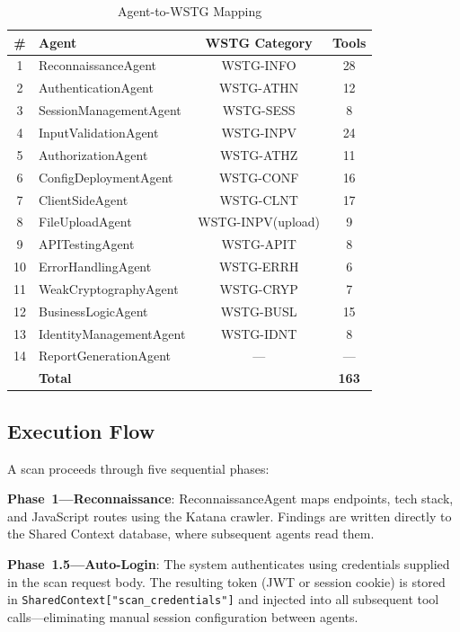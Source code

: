 \documentclass[conference]{IEEEtran}
\begin{document}
\begin{table}[!t]
\caption{Agent-to-WSTG Mapping}
\label{tab:agents}
\centering
\small
\begin{tabular}{clcc}
\toprule
\textbf{\#} & \textbf{Agent} & \textbf{WSTG Category} & \textbf{Tools} \\
\midrule
1  & ReconnaissanceAgent     & WSTG-INFO        & 28 \\
2  & AuthenticationAgent     & WSTG-ATHN        & 12 \\
3  & SessionManagementAgent  & WSTG-SESS        &  8 \\
4  & InputValidationAgent    & WSTG-INPV        & 24 \\
5  & AuthorizationAgent      & WSTG-ATHZ        & 11 \\
6  & ConfigDeploymentAgent   & WSTG-CONF        & 16 \\
7  & ClientSideAgent         & WSTG-CLNT        & 17 \\
8  & FileUploadAgent         & WSTG-INPV(upload)&  9 \\
9  & APITestingAgent         & WSTG-APIT        &  8 \\
10 & ErrorHandlingAgent      & WSTG-ERRH        &  6 \\
11 & WeakCryptographyAgent   & WSTG-CRYP        &  7 \\
12 & BusinessLogicAgent      & WSTG-BUSL        & 15 \\
13 & IdentityManagementAgent & WSTG-IDNT        &  8 \\
14 & ReportGenerationAgent   & ---              & --- \\
\midrule
   & \textbf{Total}          &                  & \textbf{163} \\
\bottomrule
\end{tabular}
\end{table}

\subsection{Execution Flow}

A scan proceeds through five sequential phases:

\textbf{Phase~1---Reconnaissance}: ReconnaissanceAgent maps
endpoints, tech stack, and JavaScript routes using the Katana
crawler. Findings are written directly to the Shared Context
database, where subsequent agents read them.

\textbf{Phase~1.5---Auto-Login}: The system authenticates using
credentials supplied in the scan request body. The resulting
token (JWT or session cookie) is stored in
\texttt{SharedContext["scan\_credentials"]} and injected into
all subsequent tool calls---eliminating manual session
configuration between agents.
\end{document}
